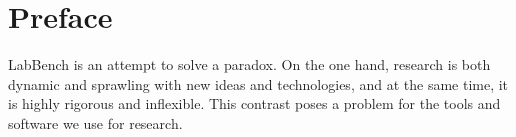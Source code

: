 \chapter{Preface}

LabBench is an attempt to solve a paradox. On the one hand, research is both dynamic and sprawling with new ideas and technologies, and at the same time, it is highly rigorous and inflexible. This contrast poses a problem for the tools and software we use for research. 
